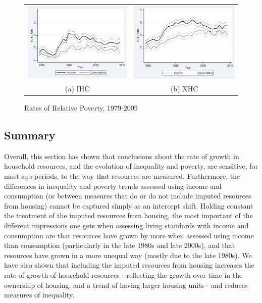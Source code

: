 \begin{figure}
\caption{Rates of Relative Poverty, 1979-2009}
\centering
\begin{tabular}{cc}
\includegraphics[width=.5\linewidth]{pictures/ihc_3.png} & \includegraphics[width=.5\linewidth]{pictures/xhc_3.png} \\
(a) IHC & (b) XHC \\
\end{tabular}
\label{fig:pov_trends}
\end{figure}

\subsection{Summary}
Overall, this section has shown that conclusions about the rate of growth in household resources, and the evolution of inequality and poverty, are sensitive, for most sub-periods, to the way that resources are measured. Furthermore, the differences in inequality and poverty trends assessed using income and consumption (or between measures that do or do not include imputed resources from housing) cannot be captured simply as an intercept shift. Holding constant the treatment of the imputed resources from housing, the most important of the different impressions one gets when assessing living standards with income and consumption are that resources have grown by more when assessed using income than consumption (particularly in the late 1980s and late 2000s), and that resources have grown in a more unequal way (mostly due to the late 1980s). We have also shown that including the imputed resources from housing increases the rate of growth of household resources - reflecting the growth over time in the ownership of housing, and a trend of having larger housing units - and reduces measures of inequality.



